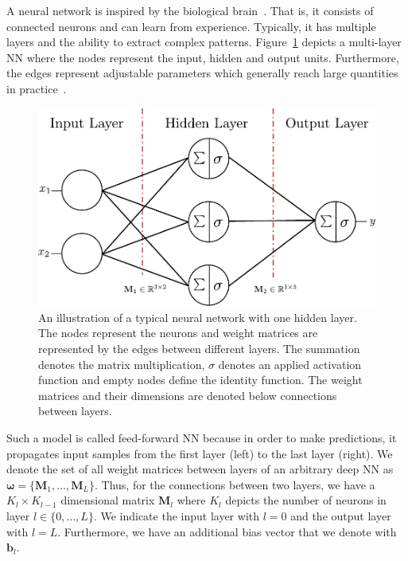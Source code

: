 \documentclass[runningheads]{llncs}
\begin{document}
A neural network is inspired by the biological brain~\cite{amit1992modeling}. 
That is, it consists of connected neurons and can learn from experience. 
Typically, it has multiple layers and the ability to extract complex patterns.
Figure~\ref{fig:normal_NN} depicts a multi-layer NN where the nodes represent the input, hidden and output units.
Furthermore, the edges represent adjustable parameters which generally reach large quantities in practice~\cite{efficient_net}.
\begin{figure}
    \centering
    \includegraphics[width=.6\textwidth]{images/NeuralNetwork.pdf}
    \caption{An illustration of a typical neural network with one hidden layer. The nodes represent the neurons and weight matrices are represented by the edges between different layers.
    The summation denotes the matrix multiplication, $\sigma$ denotes an applied activation function and empty nodes define the identity function.
    The weight matrices and their dimensions are denoted below connections between layers.
    }
    \label{fig:normal_NN}
\end{figure}
Such a model is called feed-forward NN because in order to make predictions, it propagates input samples from the first layer (left) to the last layer (right).
We denote the set of all weight matrices between layers of an arbitrary deep NN as $\boldsymbol{\omega} = \{\mathbf{M}_1, \ldots, \mathbf{M}_L\}$.
Thus, for the connections between two layers, we have a $K_l \times K_{l-1}$ dimensional matrix $\mathbf{M}_l$ where $K_l$ depicts the number of neurons in layer $l\in \{0, \ldots, L\}$.
We indicate the input layer with $l=0$ and the output layer with $l = L$.
Furthermore, we have an additional bias vector that we denote with $\mathbf{b}_l$. 
\end{document}

